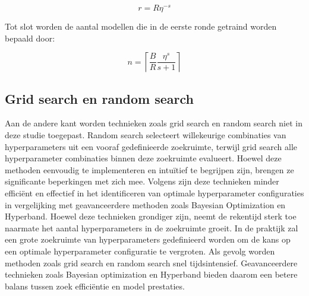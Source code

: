 \[ r=R\eta^{-s} \]

Tot slot worden de aantal modellen die in de eerste ronde getraind worden bepaald door:

\[ n=\left\lceil \frac{B}{R}\frac{\eta^s}{s+1} \right\rceil \]

\subsection{Grid search en random search}
Aan de andere kant worden technieken zoals grid search en random search niet in deze studie toegepast. Random search selecteert willekeurige combinaties van hyperparameters uit een vooraf gedefinieerde zoekruimte, terwijl grid search alle hyperparameter combinaties binnen deze zoekruimte evalueert. Hoewel deze methoden eenvoudig te implementeren en intuïtief te begrijpen zijn, brengen ze significante beperkingen met zich mee. Volgens \textcite{Kee2025} zijn deze technieken minder efficiënt en effectief in het identificeren van optimale hyperparameter configuraties in vergelijking met geavanceerdere methoden zoals Bayesian Optimization en Hyperband. Hoewel deze technieken grondiger zijn, neemt de rekentijd sterk toe naarmate het aantal hyperparameters in de zoekruimte groeit. In de praktijk zal een grote zoekruimte van hyperparameters gedefinieerd worden om de kans op een optimale hyperparameter configuratie te vergroten. Als gevolg worden methoden zoals grid search en random search snel tijdsintensief. Geavanceerdere technieken zoals Bayesian optimization en Hyperband bieden daarom een betere balans tussen zoek efficiëntie en model prestaties.



